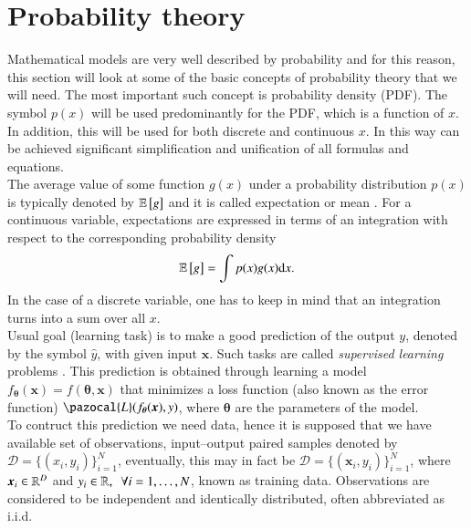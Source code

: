 \section{Probability theory}
Mathematical models are very well described by probability and for this reason, this section will look at some of the basic concepts of probability theory that we will need. The most important such concept is probability density (PDF). 
The symbol $p(x)$ will be used predominantly for the PDF, which is a function of $x$.  In addition, this will be used for both discrete and continuous $x$. In this way can be achieved significant simplification and unification of all formulas and equations. \\
The average value of some function $g(x)$ under a probability distribution $p(x)$ is typically denoted by $\mathbb{E}\left[ g \right]$ and it is called expectation or mean \cite{bishop}. For a continuous variable, expectations are expressed in terms of an integration with respect to the corresponding probability density
\begin{equation}
	\mathbb{E}\left[ g \right] = \int p(x)g(x)\mathrm{d}{x}.
\end{equation} 
In the case of a discrete variable, one has to keep in mind that an integration turns into a sum over all $x$.   \\
Usual goal (learning task) is to make a good prediction of the output $y$, denoted by the symbol $\hat{y}$, with given input $\boldsymbol{x}$. Such tasks are called \emph{supervised learning} problems \cite{supervised}. This prediction is obtained through learning a model $f_{\boldsymbol{\theta}}\left(\boldsymbol{x}\right) = f\left(\boldsymbol{\theta}, \boldsymbol{x}\right)$ that minimizes a loss function (also known as the error function) $\pazocal{L}(f_{\boldsymbol{\theta}}(\boldsymbol{x}), y)$, where $\boldsymbol{\theta}$ are the parameters of the model. \\
To contruct this prediction we need data, hence it is supposed that we have available set of observations, input--output paired samples denoted by $\mathcal{D} = \lbrace \left(x_i , y_i \right)\rbrace_{i=1}^N$, eventually, this may in fact be $\mathcal{D} = \lbrace\left( \boldsymbol{x}_i , y_i \right)\rbrace_{i=1}^N$, where $\boldsymbol{x}_i \in \mathbb{R}^D$ and $y_i \in \mathbb{R},~~\forall i = 1,\dots,N$, known as training data.  Observations are considered to be independent and identically distributed, often abbreviated as i.i.d. 




